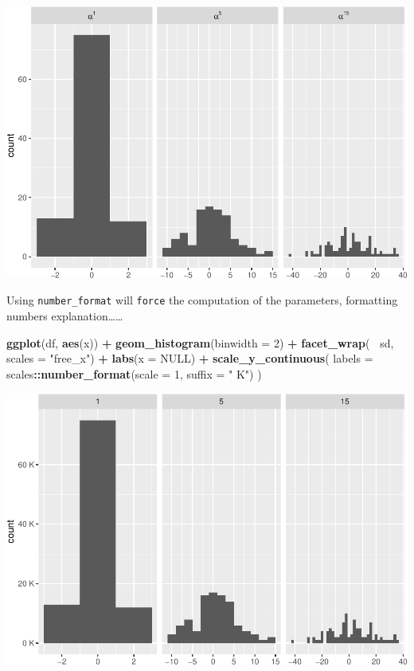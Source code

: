 \documentclass[]{book}
\newenvironment{Shaded}{\begin{snugshade}}{\end{snugshade}}
\newcommand{\DataTypeTok}[1]{\textcolor[rgb]{0.13,0.29,0.53}{#1}}
\newcommand{\DecValTok}[1]{\textcolor[rgb]{0.00,0.00,0.81}{#1}}
\newcommand{\KeywordTok}[1]{\textcolor[rgb]{0.13,0.29,0.53}{\textbf{#1}}}
\newcommand{\NormalTok}[1]{#1}
\newcommand{\OperatorTok}[1]{\textcolor[rgb]{0.81,0.36,0.00}{\textbf{#1}}}
\newcommand{\OtherTok}[1]{\textcolor[rgb]{0.56,0.35,0.01}{#1}}
\newcommand{\StringTok}[1]{\textcolor[rgb]{0.31,0.60,0.02}{#1}}
\begin{document}
\includegraphics{AdvancedR_Companion_files/figure-latex/unnamed-chunk-239-1.pdf}

Using \texttt{number\_format} will \texttt{force} the computation of the parameters, formatting numbers explanation\ldots{}\ldots{}

\begin{Shaded}
\begin{Highlighting}[]
\KeywordTok{ggplot}\NormalTok{(df, }\KeywordTok{aes}\NormalTok{(x)) }\OperatorTok{+}\StringTok{ }
\StringTok{  }\KeywordTok{geom_histogram}\NormalTok{(}\DataTypeTok{binwidth =} \DecValTok{2}\NormalTok{) }\OperatorTok{+}\StringTok{ }
\StringTok{  }\KeywordTok{facet_wrap}\NormalTok{(}\OperatorTok{~}\StringTok{ }\NormalTok{sd, }\DataTypeTok{scales =} \StringTok{"free_x"}\NormalTok{) }\OperatorTok{+}\StringTok{ }
\StringTok{  }\KeywordTok{labs}\NormalTok{(}\DataTypeTok{x =} \OtherTok{NULL}\NormalTok{) }\OperatorTok{+}
\StringTok{  }\KeywordTok{scale_y_continuous}\NormalTok{(}
  \DataTypeTok{labels =}\NormalTok{ scales}\OperatorTok{::}\KeywordTok{number_format}\NormalTok{(}\DataTypeTok{scale =} \DecValTok{1}\NormalTok{, }\DataTypeTok{suffix =} \StringTok{" K"}\NormalTok{) }
\NormalTok{)}
\end{Highlighting}
\end{Shaded}

\includegraphics{AdvancedR_Companion_files/figure-latex/unnamed-chunk-240-1.pdf}
\end{document}
